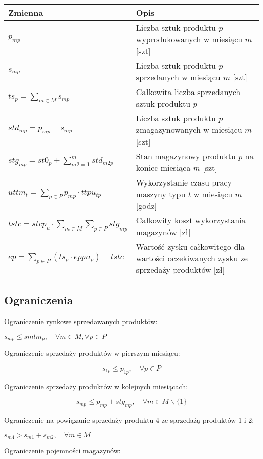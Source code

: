 \documentclass[12pt]{article}
\begin{document}
\begin{table}[h!]
\centering
\begin{tabular}{|l|p{10cm}|}
\hline
Zmienna & Opis \\
\hline
$p_{mp}$ & Liczba sztuk produktu $p$ wyprodukowanych w miesiącu $m$ [szt] \\
\hline
$s_{mp}$ & Liczba sztuk produktu $p$ sprzedanych w miesiącu $m$ [szt] \\
\hline
$ts_p = \sum_{m \in M} s_{mp}$ & Całkowita liczba sprzedanych sztuk produktu $p$ \\
\hline
$std_{mp} = p_{mp} - s_{mp}$ & Liczba sztuk produktu $p$ zmagazynowanych w miesiącu $m$ [szt] \\
\hline
$stg_{mp} = st0_p + \sum_{m2=1}^{m} std_{m2p}$ & Stan magazynowy produktu $p$ na koniec miesiąca $m$ [szt] \\
\hline
$uttm_t = \sum_{p \in P} p_{mp} \cdot ttpu_{tp}$ & Wykorzystanie czasu pracy maszyny typu $t$ w miesiącu $m$ [godz] \\
\hline
$tstc = stcp_u \cdot \sum_{m \in M} \sum_{p \in P} stg_{mp}$ & Całkowity koszt wykorzystania magazynów [zł] \\
\hline
$ep = \sum_{p \in P} (ts_p \cdot eppu_p) - tstc$ & Wartość zysku całkowitego dla wartości oczekiwanych zysku ze sprzedaży produktów [zł] \\
\hline
\end{tabular}
\end{table}

\subsection{Ograniczenia}

Ograniczenie rynkowe sprzedawanych produktów:

$s_{mp} \leq smlm_p, \quad \forall m \in M, \forall p \in P$

Ograniczenie sprzedaży produktów w pierszym miesiącu:

$$s_{1p} \leqslant p_{1p}, \quad \forall p \in P$$

Ograniczenie sprzedaży produktów w kolejnych miesiącach:

$$s_{mp} \leqslant p_{mp} + stg_{mp}, \quad \forall m \in M \backslash \{1\}$$

Ograniczenie na powiązanie sprzedaży produktu 4 ze sprzedażą produktów 1 i 2:

$s_{m4} > s_{m1} + s_{m2}, \quad \forall m \in M$

Ograniczenie pojemności magazynów:
\end{document}
